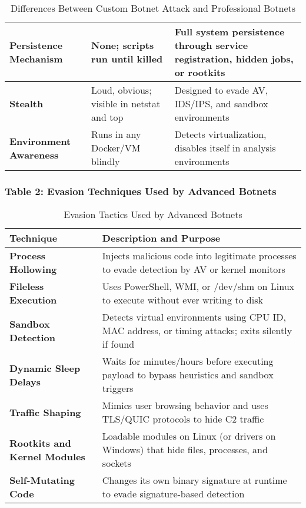 \documentclass{article}
\begin{document}
\begin{table}[h!]
\begin{tabular}{|p{4.2cm}|p{5.5cm}|p{5.5cm}|}
\hline
\textbf{Persistence Mechanism} & None; scripts run until killed & Full system persistence through service registration, hidden jobs, or rootkits \\
\hline
\textbf{Stealth} & Loud, obvious; visible in netstat and top & Designed to evade AV, IDS/IPS, and sandbox environments \\
\hline
\textbf{Environment Awareness} & Runs in any Docker/VM blindly & Detects virtualization, disables itself in analysis environments \\
\hline
\end{tabular}
\caption{Differences Between Custom Botnet Attack and Professional Botnets}
\label{tab:comparison}
\end{table}
\clearpage
\subsubsection*{Table 2: Evasion Techniques Used by Advanced Botnets}
\begin{table}[h!]
\centering
\renewcommand{\arraystretch}{1.4}
\begin{tabular}{|p{5cm}|p{9.5cm}|}
\hline
\rowcolor{blue!15}
\textbf{Technique} & \textbf{Description and Purpose} \\
\hline
\textbf{Process Hollowing} & Injects malicious code into legitimate processes to evade detection by AV or kernel monitors \\
\hline
\textbf{Fileless Execution} & Uses PowerShell, WMI, or /dev/shm on Linux to execute without ever writing to disk \\
\hline
\textbf{Sandbox Detection} & Detects virtual environments using CPU ID, MAC address, or timing attacks; exits silently if found \\
\hline
\textbf{Dynamic Sleep Delays} & Waits for minutes/hours before executing payload to bypass heuristics and sandbox triggers \\
\hline
\textbf{Traffic Shaping} & Mimics user browsing behavior and uses TLS/QUIC protocols to hide C2 traffic \\
\hline
\textbf{Rootkits and Kernel Modules} & Loadable modules on Linux (or drivers on Windows) that hide files, processes, and sockets \\
\hline
\textbf{Self-Mutating Code} & Changes its own binary signature at runtime to evade signature-based detection \\
\hline
\end{tabular}
\caption{Evasion Tactics Used by Advanced Botnets}
\label{tab:evasion}
\end{table}
\end{document}
